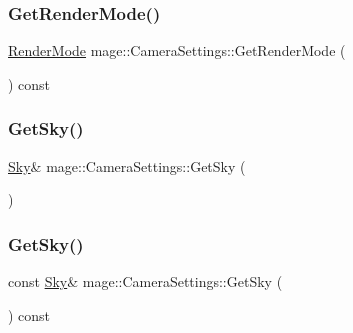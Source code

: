 \hypertarget{classmage_1_1_camera_settings_a6673291bcfed8fa2c0a0041bf8f97f24}{}\label{classmage_1_1_camera_settings_a6673291bcfed8fa2c0a0041bf8f97f24} 
\subsubsection{\texorpdfstring{Get\+Render\+Mode()}{GetRenderMode()}}
{\footnotesize\ttfamily \hyperlink{namespacemage_a5e7e18b0154373ce8fc942fe3f6b27fd}{Render\+Mode} mage\+::\+Camera\+Settings\+::\+Get\+Render\+Mode (\begin{DoxyParamCaption}{ }\end{DoxyParamCaption}) const\hspace{0.3cm}{\ttfamily [noexcept]}}

\hypertarget{classmage_1_1_camera_settings_add70e097b67b2a181eb61b2b8f1263e0}{}\label{classmage_1_1_camera_settings_add70e097b67b2a181eb61b2b8f1263e0} 
\subsubsection{\texorpdfstring{Get\+Sky()}{GetSky()}\hspace{0.1cm}{\footnotesize\ttfamily [1/2]}}
{\footnotesize\ttfamily \hyperlink{classmage_1_1_sky}{Sky}\& mage\+::\+Camera\+Settings\+::\+Get\+Sky (\begin{DoxyParamCaption}{ }\end{DoxyParamCaption})\hspace{0.3cm}{\ttfamily [noexcept]}}

\hypertarget{classmage_1_1_camera_settings_a538464550850914bc531ba7b12515ce1}{}\label{classmage_1_1_camera_settings_a538464550850914bc531ba7b12515ce1} 
\subsubsection{\texorpdfstring{Get\+Sky()}{GetSky()}\hspace{0.1cm}{\footnotesize\ttfamily [2/2]}}
{\footnotesize\ttfamily const \hyperlink{classmage_1_1_sky}{Sky}\& mage\+::\+Camera\+Settings\+::\+Get\+Sky (\begin{DoxyParamCaption}{ }\end{DoxyParamCaption}) const\hspace{0.3cm}{\ttfamily [noexcept]}}

